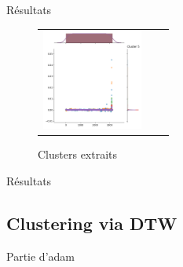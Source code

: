 \documentclass{beamer}
\begin{document}
\begin{frame}{Résultats}
\begin{figure}
\begin{tabular}{ccc}
            \includegraphics[width=3.3cm]{clust/clust5.png}
        \end{tabular}
        \caption{Clusters extraits}
    \end{figure}
\end{frame}


\begin{frame}{Résultats}
    \subsection{Clustering via DTW}\label{subsec:res-dtw}
    Partie d'adam
\end{frame}

\begin{frame}
\end{frame}
\end{document}
